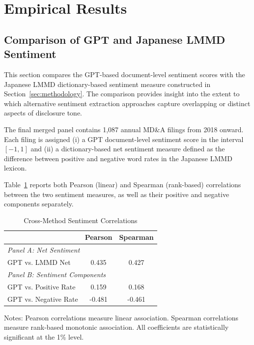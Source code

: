 \section{Empirical Results}
\label{sec:empiricalreults}

\subsection{Comparison of GPT and Japanese LMMD Sentiment}
\label{subsec:crossmethodsentimentagreement} 

This section compares the GPT-based document-level sentiment scores with the Japanese LMMD dictionary-based sentiment measure constructed in Section~\ref{sec:methodology}. The comparison provides insight into the extent to which alternative sentiment extraction approaches capture overlapping or distinct aspects of disclosure tone.

The final merged panel contains 1,087 annual MD\&A filings from 2018 onward.
Each filing is assigned (i) a GPT document-level sentiment score in the
interval $[-1,1]$ and (ii) a dictionary-based net sentiment measure defined
as the difference between positive and negative word rates in the Japanese
LMMD lexicon.

Table~\ref{tab:cross_method_corr} reports both Pearson (linear) and Spearman
(rank-based) correlations between the two sentiment measures, as well as
their positive and negative components separately.

\begin{table}[ht]
\centering
\caption{Cross-Method Sentiment Correlations}
\label{tab:cross_method_corr}
\begin{tabular}{lcc}
\toprule
 & Pearson & Spearman \\
\midrule
\multicolumn{3}{l}{\textit{Panel A: Net Sentiment}} \\
GPT vs. LMMD Net & 0.435 & 0.427 \\
\midrule
\multicolumn{3}{l}{\textit{Panel B: Sentiment Components}} \\
GPT vs. Positive Rate & 0.159 & 0.168 \\
GPT vs. Negative Rate & -0.481 & -0.461 \\
\bottomrule
\end{tabular}
\begin{flushleft}
\footnotesize
Notes: Pearson correlations measure linear association. Spearman correlations measure rank-based
monotonic association. All coefficients are statistically significant at the 1\% level.
\end{flushleft}
\end{table}

